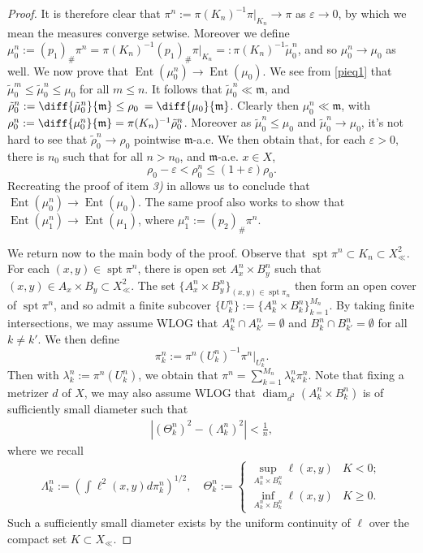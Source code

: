 \documentclass{article}
\renewcommand{\epsilon}{\varepsilon}
\newcommand{\m}{\mathfrak{m}}
\DeclareMathOperator{\spt}{spt}
\DeclareMathOperator{\diam}{diam}
\DeclareMathOperator{\Ent}{Ent}
\theoremstyle{definition}
\begin{document}
{\begin{proof}
It is therefore clear that $\pi^n:=\pi(K_n)^{-1}\pi|_{K_n}\to \pi$ as $\epsilon\to 0$, by which we mean the measures converge setwise. Moreover we define $\mu_0^n:= (p_1)_\# \pi^n=\pi(K_n)^{-1} (p_1)_\#\pi|_{K_n}=: \pi(K_n)^{-1} \tilde\mu_0^n$, and so $\mu_0^n\to\mu_0$ as well. We now prove that $\Ent(\mu_0^n)\to \Ent(\mu_0)$. We see from \eqref{pieq1} that $\tilde\mu_0^{m}\leq\tilde\mu_0^n\leq \mu_0 $ for all $m\leq n$. It follows that $\tilde\mu_0^n\ll \m$, and $\tilde \rho_0^n:=\diff{\tilde\mu_0^n}{\m}\leq \rho_0\:=\diff{\mu_0}{\m}$. Clearly then $\mu_0^n\ll \m$, with $\rho_0^n:=\diff{\mu_0^n}{\m}= \pi(K_n)^{-1} \tilde\rho_0^n$. Moreover as $\tilde\mu_0^n\leq \mu_0$ and $\tilde \mu_0^n\to \mu_0$, it's not hard to see that $\tilde \rho_0^n\to \rho_0$ pointwise $\m$-a.e. We then obtain that, for each $\epsilon>0$, there is $n_0$ such that for all $n>n_0$, and $\m$-a.e. $x\in X$, 
\[\rho_0-\epsilon< \rho_0^n\leq (1+\epsilon)\rho_0.\]
Recreating the proof of item {\it 3)} in  allows us to conclude that $\Ent(\mu_0^n)\to \Ent(\mu_0)$. The same proof also works to show that $\Ent(\mu_1^n)\to \Ent(\mu_1)$, where $\mu_1^n:= (p_2)_\# \pi^n$. 


We return now to the main body of the proof. 
Observe that $\spt\pi^n\subset K_n\subset X_\ll^2$. For each $(x,y)\in \spt\pi^n$, there is open set $ A_x^n\times B_y^n$ such that $(x,y)\in A_x\times B_y\subset X_\ll^2$. The set $\{A_x^n \times  B_y^n\}_{(x,y)\in \spt\pi_n}$ then form an open cover of $\spt\pi^n$, and so admit a finite subcover $\{U_k^n\}:=\{A_k^n\times B_k^n \}_{k=1}^{M_n}$. By taking finite intersections, we may assume WLOG that $A_k^n\cap A_{k'}^n=\emptyset$ and $B_k^n\cap B_{k'}^n=\emptyset$ for all $k\neq k'$. 
We then define 
\[\pi^n_k:= \pi^n(U^n_k)^{-1}\pi^n|_{U^n_k}.\]
Then with $\lambda_k^n:= \pi^n(U^n_k)$, we obtain that $\pi^n=\sum_{k=1}^{M_n}\lambda_k^n \pi_k^n$. Note that fixing a metrizer $d$ of $X$, we may also assume WLOG that $\diam_{d^2}(A_k^n\times B_k^n)$ is of sufficiently small diameter such that 
\begin{align}\label{ThetaLambdaestimate}
|(\Theta_k^n)^2-(\Lambda_k^n)^2|< \frac 1n,
\end{align}
where we recall 
\begin{align*}
\Lambda_k^n:= \left(\int \ell^2(x,y) d\pi_k^n\right)^{1/2},\quad
\Theta_k^n:= \begin{cases}
\sup_{A_k^n\times B_k^n}\ell(x,y) & K<0;\\
\inf_{A_k^n\times B_k^n}\ell(x,y) & K\geq 0.
\end{cases}
\end{align*}
Such a sufficiently small diameter exists by the uniform continuity of $\ell$ over the compact set $K\subset X_\ll$. 



\end{proof}}
\end{document}
